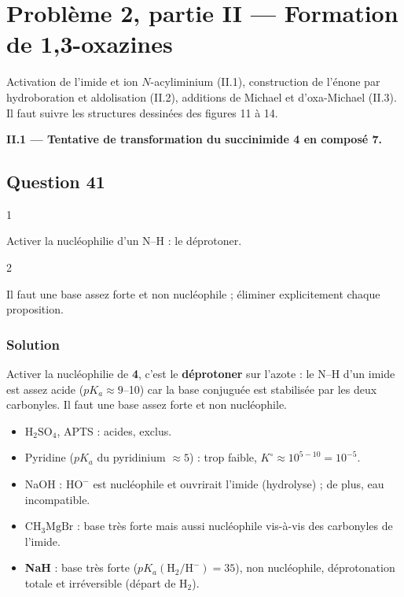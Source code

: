 \documentclass[11pt,a4paper]{article}
\providecommand{\tightlist}{\setlength{\itemsep}{0pt}\setlength{\parskip}{0pt}}
\begin{document}
\hypertarget{probluxe8me-2-partie-ii-formation-de-13-oxazines}{%
\section{Problème 2, partie II --- Formation de 1,3-oxazines}\label{probluxe8me-2-partie-ii-formation-de-13-oxazines}}

Activation de l'imide et ion \(N\)-acyliminium (II.1), construction de l'énone par hydroboration et aldolisation (II.2), additions de Michael et d'oxa-Michael (II.3). Il faut suivre les structures dessinées des figures 11 à 14.

\textbf{II.1 --- Tentative de transformation du succinimide 4 en composé 7.}

\hypertarget{question-41}{%
\subsection{Question 41}\label{question-41}}

\begin{indication}{1}

Activer la nucléophilie d'un N--H : le déprotoner.

\end{indication}

\begin{indication}{2}

Il faut une base assez forte et non nucléophile ; éliminer explicitement chaque proposition.

\end{indication}

\hypertarget{solution-40}{%
\subsubsection{Solution}\label{solution-40}}

Activer la nucléophilie de \textbf{4}, c'est le \textbf{déprotoner} sur l'azote : le N--H d'un imide est assez acide (\(pK_a\approx9\)--10) car la base conjuguée est stabilisée par les deux carbonyles. Il faut une base assez forte et non nucléophile.

\begin{itemize}
\tightlist
\item
  \(\mathrm{H_2SO_4}\), APTS : acides, exclus.
\item
  Pyridine (\(pK_a\) du pyridinium \(\approx5\)) : trop faible, \(K^\circ\approx10^{5-10}=10^{-5}\).
\item
  NaOH : \(\mathrm{HO^-}\) est nucléophile et ouvrirait l'imide (hydrolyse) ; de plus, eau incompatible.
\item
  \(\mathrm{CH_3MgBr}\) : base très forte mais aussi nucléophile vis-à-vis des carbonyles de l'imide.
\item
  \textbf{NaH} : base très forte (\(pK_a(\mathrm{H_2/H^-})=35\)), non nucléophile, déprotonation totale et irréversible (départ de \(\mathrm{H_2}\)).
\end{itemize}
\end{document}

